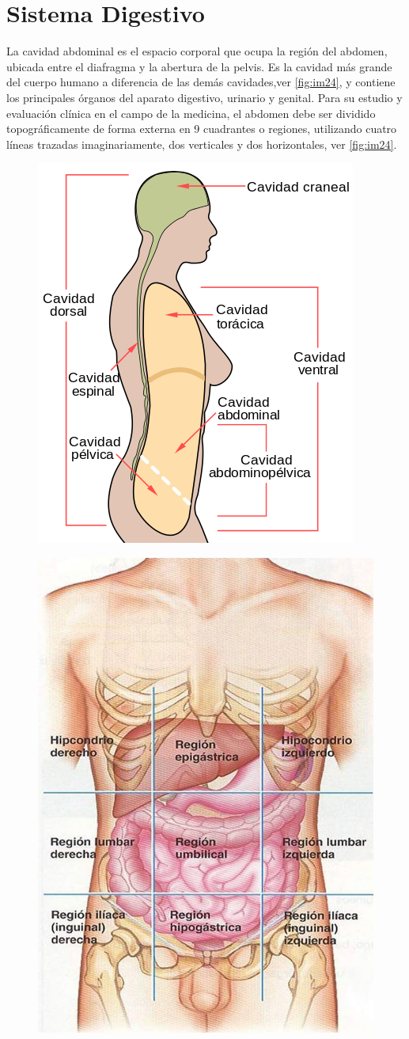 \section{Sistema Digestivo}
La cavidad abdominal 
es el espacio corporal que ocupa la región del abdomen, ubicada entre el diafragma y la abertura de la pelvis. 
Es la cavidad más grande del cuerpo humano 
a diferencia de las demás cavidades,ver \ref{fig:im24}, y 
contiene los principales órganos del aparato digestivo, urinario y genital.
Para su estudio y evaluación clínica en el campo de la medicina, 
el abdomen debe ser dividido topográficamente de forma externa en 9 
cuadrantes o regiones, utilizando cuatro líneas 
trazadas imaginariamente, dos verticales y dos horizontales, ver \ref{fig:im24}.\cite{web12}
\begin{figure}
 \begin{center}
  \includegraphics[width = .3\textwidth]{source/images/image56.png}
 \end{center} 
\end{figure}

\begin{figure}[H]
	\begin{center}
 		\includegraphics[width = .3\textwidth]{v3/images/image1.jpg}
	\end{center} 
\end{figure}

